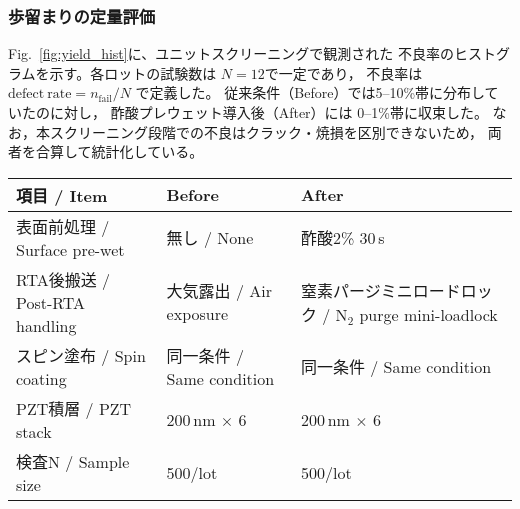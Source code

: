 \documentclass[conference]{IEEEtran}
\begin{document}
\subsubsection*{歩留まりの定量評価}
Fig.~\ref{fig:yield_hist}に、ユニットスクリーニングで観測された
不良率のヒストグラムを示す。各ロットの試験数は $N=12$で一定であり，
不良率は $\mathrm{defect\ rate}=n_{\mathrm{fail}}/N$ で定義した。
従来条件（Before）では5--10\%帯に分布していたのに対し，
酢酸プレウェット導入後（After）には 0--1\%帯に収束した。
なお，本スクリーニング段階での不良はクラック・焼損を区別できないため，
両者を合算して統計化している。

\begin{figure*}[t]
  \centering
  \caption{Histogram of unit-screening defect rates (Before/After; common bins).}
  \label{fig:yield_hist}
\end{figure*}

\begin{table*}[t]
  \centering
  \caption{%
    比較プロセス条件（Before/After）／
    Compared process conditions (Before/After)}
  \label{tab:proc-compare}
  \setlength{\tabcolsep}{6pt}
  \begin{tabular}{@{} lll @{}}
    \toprule
    \textbf{項目 / Item} & \textbf{Before} & \textbf{After} \\
    \midrule
    表面前処理 / Surface pre-wet
      & 無し / None
      & 酢酸2\% 30\,s \\
    RTA後搬送 / Post-RTA handling
      & 大気露出 / Air exposure
      & 窒素パージミニロードロック / N$_2$ purge mini-loadlock \\
    スピン塗布 / Spin coating
      & 同一条件 / Same condition
      & 同一条件 / Same condition \\
    PZT積層 / PZT stack
      & 200\,nm $\times$ 6
      & 200\,nm $\times$ 6 \\
    検査N / Sample size
      & 500/lot
      & 500/lot \\
    \bottomrule
  \end{tabular}
\end{table*}
\end{document}
